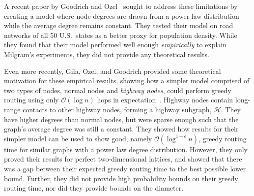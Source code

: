 A recent paper by Goodrich and Ozel~\cite{goodrich2022modeling} sought to
address these limitations by creating a model where node degrees are drawn from
a power law distribution while the average degree remains constant.
They tested their model on road networks of all 50 U.S.~states as a 
better proxy for population density.
While they found that their model performed
well enough \textit{empirically} to explain Milgram's experiments, 
they did not provide any theoretical results.

Even more recently, Gila, Ozel, and Goodrich provided some theoretical
motivation for these empirical results, showing how a simpler model comprised of
two types of nodes, normal nodes and \emph{highway nodes}, could perform greedy
routing using only $\mathcal{O}(\log n)$ hops in
expectation~\cite{gila2023highway}.
Highway nodes contain long-range contacts to other highway nodes, 
forming a highway subgraph, $\mathcal{H}$. 
They have higher degrees than normal nodes, but were sparse enough 
such that the graph's average degree was still a constant.
They showed how results for their simpler model can be used to show good,
namely $\mathcal{O}(\log^{1 + \epsilon} n)$, greedy routing time for similar
graphs with a power law degree distribution.
However, they only proved their results for perfect two-dimensional lattices, and
showed that there was a gap between their expected greedy routing time to the
best possible lower bound.
Further, they did not provide high probability bounds on their greedy routing
time, nor did they provide bounds on the diameter.



